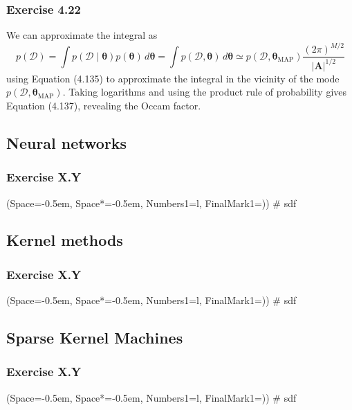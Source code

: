 \documentclass[12pt, a4paper]{article}
\newcommand{\listSpace}{-0.5em}%
\newcommand{\D}{\mathcal{D}}
\newcommand{\vect}[1]{\bm{#1}}
\newcommand{\abs}[1]{\left\lvert#1\right\rvert}
\begin{document}
\subsubsection*{Exercise 4.22}
We can approximate the integral as
\begin{equation*}
	p(\D) = \int p( \D \mid \vect{\theta}) p(\vect{\theta}) \, d\vect{\theta}
	= \int p( \D , \vect{\theta}) \, d\vect{\theta}
	\simeq p( \D , \vect{\theta}_{\text{MAP}})  \frac{(2 \pi)^{M/2}}{\abs{\vect{A}}^{1/2}}
\end{equation*}
using Equation (4.135) to approximate the integral in the vicinity of the mode $p( \D , \vect{\theta}_{\text{MAP}})$.
Taking logarithms and using the product rule of probability gives Equation (4.137), revealing the Occam factor.

\subsection{Neural networks}
\subsubsection*{Exercise X.Y}
\begin{easylist}[enumerate]
	\ListProperties(Space=\listSpace, Space*=\listSpace, Numbers1=l, FinalMark1={)})
	# sdf
\end{easylist}

\subsection{Kernel methods}
\subsubsection*{Exercise X.Y}
\begin{easylist}[enumerate]
	\ListProperties(Space=\listSpace, Space*=\listSpace, Numbers1=l, FinalMark1={)})
	# sdf
\end{easylist}

\subsection{Sparse Kernel Machines}
\subsubsection*{Exercise X.Y}
\begin{easylist}[enumerate]
	\ListProperties(Space=\listSpace, Space*=\listSpace, Numbers1=l, FinalMark1={)})
	# sdf
\end{easylist}
\end{document}
